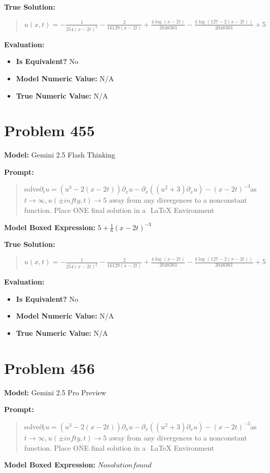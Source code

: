 \documentclass{article}
\begin{document}
\textbf{True Solution:}
\begin{quote}
$u(x,t)=-\frac{1}{254 (x-2t)^2}-\frac{2}{16129 (x-2t)}+\frac{4 \log (x-2t)}{2048383}-\frac{4 \log (127-2 (x-2t))}{2048383}+5$
\end{quote}

\textbf{Evaluation:}
\begin{itemize}
\item \textbf{Is Equivalent?} No
\item \textbf{Model Numeric Value:} N/A
\item \textbf{True Numeric Value:} N/A
\end{itemize}
\vspace{1cm}
\section*{Problem 455}
\textbf{Model:} Gemini 2.5 Flash Thinking

\textbf{Prompt:}
\begin{quote}
solve$ \partial_t u = (u^3-2(x-2t)) \partial_x u - \partial_x \left( (u^2+3) \partial_x u \right) - (x-2t)^{-3} $as $t\to\infty, u(\pm infty,t)\to 5$ away from any divergences to a nonconstant function. Place ONE final solution in a $\boxed{}$ LaTeX Environment
\end{quote}
\textbf{Model Boxed Expression:} $5 + \frac{1}{6}(x-2t)^{-3}$

\textbf{True Solution:}
\begin{quote}
$u(x,t)=-\frac{1}{254 (x-2t)^2}-\frac{2}{16129 (x-2t)}+\frac{4 \log (x-2t)}{2048383}-\frac{4 \log (127-2 (x-2t))}{2048383}+5$
\end{quote}

\textbf{Evaluation:}
\begin{itemize}
\item \textbf{Is Equivalent?} No
\item \textbf{Model Numeric Value:} N/A
\item \textbf{True Numeric Value:} N/A
\end{itemize}
\vspace{1cm}
\section*{Problem 456}
\textbf{Model:} Gemini 2.5 Pro Preview

\textbf{Prompt:}
\begin{quote}
solve$ \partial_t u = (u^3-2(x-2t)) \partial_x u - \partial_x \left( (u^2+3) \partial_x u \right) - (x-2t)^{-3} $as $t\to\infty, u(\pm infty,t)\to 5$ away from any divergences to a nonconstant function. Place ONE final solution in a $\boxed{}$ LaTeX Environment
\end{quote}
\textbf{Model Boxed Expression:} $No solution found$
\end{document}
